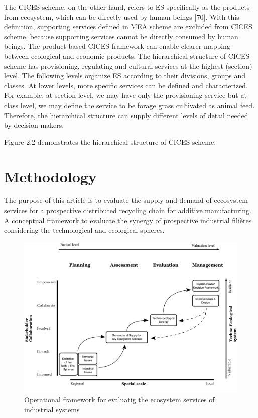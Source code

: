 \documentclass[
]{article}
\begin{document}
The CICES scheme, on the other hand, refers to ES specifically as the products from ecosystem, which can be directly used by human-beings {[}70{]}.
With this definition, supporting services defined in MEA scheme are excluded from CICES scheme, because supporting services cannot be directly consumed by human beings.
The product-based CICES framework can enable clearer mapping between ecological and economic products.
The hierarchical structure of CICES scheme has provisioning, regulating and cultural services at the highest (section) level.
The following levels organize ES according to their divisions, groups and classes.
At lower levels, more specific services can be defined and characterized.
For example, at section level, we may have only the provisioning service but at class level, we may define the service to be forage grass cultivated as animal feed.
Therefore, the hierarchical structure can supply different levels of detail needed by decision makers.

Figure 2.2 demonstrates the hierarchical structure of CICES scheme.

\hypertarget{methodology}{%
\section{Methodology}\label{methodology}}

The purpose of this article is to evaluate the supply and demand of eecosystem services for a prospective distributed recycling chain for additive manufacturing.
A conceptual framework to evaluate the synergy of prospective industrial filières considering the technological and ecological spheres.

\begin{figure}[!ht]

{\centering \includegraphics[width=1\linewidth]{Figures/Methodology} 

}

\caption{Operational framework for evaluatig the ecosystem services of industrial systems}\label{fig:Fig-Methodology}
\end{figure}
\end{document}

